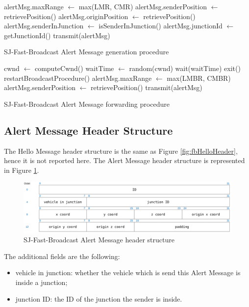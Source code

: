 		\begin{algorithm}[H]
			\begin{algorithmic}[1]
				\State alertMsg.maxRange $\gets$ max(LMR, CMR)
				\State alertMsg.senderPosition $\gets$ retrievePosition()
				\State alertMsg.originPosition $\gets$ retrievePosition()
				\State alertMsg.senderInJunction $\gets$ isSenderInJunction()
				\State alertMsg.junctionId $\gets$ getJunctionId()
				\State transmit(alertMsg)
			\end{algorithmic}
			\caption{SJ-Fast-Broadcast Alert Message generation procedure}
			\label{alg:sj-alert-message-generation}
		\end{algorithm}
		
		\begin{algorithm}[H]
			\begin{algorithmic}[1]
				\State cwnd $\gets$ computeCwnd()
				\State waitTime $\gets$ random(cwnd)
				\State wait(waitTime)
				\State exit()
				\State restartBroadcastProcedure()
				\Else 
				\State alertMsg.maxRange $\gets$ max(LMBR, CMBR)
				\State alertMsg.senderPosition $\gets$ retrievePosition()
				\State transmit(alertMsg)
				\EndIf 
			\end{algorithmic}
			\caption{SJ-Fast-Broadcast Alert Message forwarding procedure}
			\label{alg:sj-alert-message-forwarding}
		\end{algorithm}
	
		\subsection{Alert Message Header Structure}
			The Hello Message header structure is the same as Figure \ref{fig:fbHelloHeader}, hence it is not reported here. The Alert Message header structure is represented in Figure \ref{fig:sj-fbAlertHeader}.
			
			\begin{figure}[H]
				\centering
				\includegraphics[width=\textwidth]{immagini/sj-fbAlertHeader}
				\caption{SJ-Fast-Broadcast Alert Message header structure}
				\label{fig:sj-fbAlertHeader}
			\end{figure}
			
			The additional fields are the following:
			\begin{itemize}
				\item  vehicle in junction: whether the vehicle which is send this Alert Message is inside a junction;
				\item junction ID: the ID of the junction the sender is inside.
			\end{itemize}